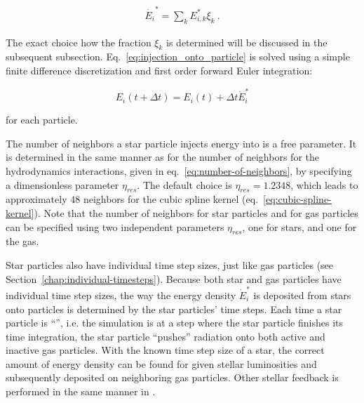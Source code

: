 \begin{align}
    \dot{E_i}^* = \sum_k E_{i,k}^* \xi_k \label{eq:injection_onto_particle} \ .
\end{align}

The exact choice how the fraction $\xi_k$ is determined will be discussed in the subsequent
subsection. Eq.~\ref{eq:injection_onto_particle} is solved using a simple finite difference
discretization and first order forward Euler integration:

\begin{equation}
    E_i(t + \Delta t) = E_i(t) + \Delta t \dot{E}_i^*
\end{equation}

for each particle.

The number of neighbors a star particle injects energy into is a free parameter. It is determined
in the same manner as for the number of neighbors for the hydrodynamics interactions, given in
eq.~\ref{eq:number-of-neighbors}, by specifying a dimensionless parameter $\eta_{res}$. The default
choice is $\eta_{res} = 1.2348$, which leads to approximately 48 neighbors for the cubic spline
kernel (eq.~\ref{eq:cubic-spline-kernel}). Note that the number of neighbors for star particles and
for gas particles can be specified using two independent parameters $\eta_{res}$, one for stars,
and one for the gas.

Star particles also have individual time step sizes, just like gas particles (see
Section~\ref{chap:individual-timesteps}). Because both star and gas particles have individual time
step sizes, the way the energy density $\dot{E}_i^*$ is deposited from stars onto particles is
determined by the star particles' time steps. Each time a star particle is ``'', i.e.
the simulation is at a step where the star particle finishes its time integration, the star particle
``pushes'' radiation onto both active and inactive gas particles. With the known time step size of a
star, the correct amount of energy density can be found for given stellar luminosities and
subsequently deposited on neighboring gas particles. Other stellar feedback is performed in the
same manner in \swift.

